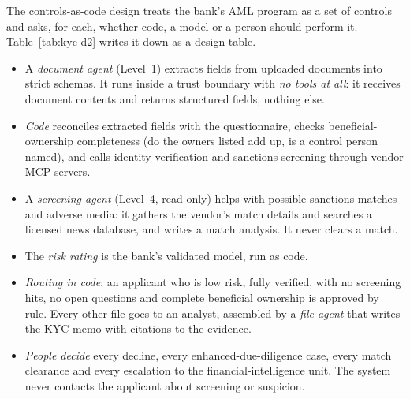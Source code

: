 The controls-as-code design treats the bank's AML program as a set of controls and asks, for each, whether code, a model or a person should perform it. Table~\ref{tab:kyc-d2} writes it down as a design table.
\begin{itemize}[itemsep=1pt]
  \item A \emph{document agent} (Level~1) extracts fields from uploaded documents into strict schemas. It runs inside a trust boundary with \emph{no tools at all}: it receives document contents and returns structured fields, nothing else.
  \item \emph{Code} reconciles extracted fields with the questionnaire, checks beneficial-ownership completeness (do the owners listed add up, is a control person named), and calls identity verification and sanctions screening through vendor MCP servers.
  \item A \emph{screening agent} (Level~4, read-only) helps with possible sanctions matches and adverse media: it gathers the vendor's match details and searches a licensed news database, and writes a match analysis. It never clears a match.
  \item The \emph{risk rating} is the bank's validated model, run as code.
  \item \emph{Routing in code}: an applicant who is low risk, fully verified, with no screening hits, no open questions and complete beneficial ownership is approved by rule. Every other file goes to an analyst, assembled by a \emph{file agent} that writes the KYC memo with citations to the evidence.
  \item \emph{People decide} every decline, every enhanced-due-diligence case, every match clearance and every escalation to the financial-intelligence unit. The system never contacts the applicant about screening or suspicion.
\end{itemize}


